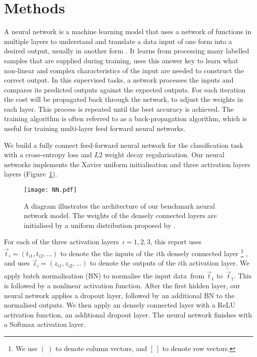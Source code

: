 \section{Methods \label{chapter2}}
A neural network is a machine learning model that uses a network of functions in multiple layers to understand and translate a data input of one form into a desired output,
usually in another form \citep{Bishop:2006:PRM:1162264}.
It learns from processing many labelled samples that are supplied during training, uses this answer key to learn what non-linear and complex characteristics of the input are needed to construct the correct output.
In this supervised tasks,
a network processes the inputs and compares its predicted outputs against the expected outputs.
For each iteration the cost will be propagated back through the network,
to adjust the weights in each layer.
This process is repeated until the best accuracy is achieved.
The training algorithm is often referred to as a back-propagation algorithm,
which is useful for training multi-layer feed forward neural networks.

We build a fully connect feed-forward neural network for the classification task with a cross-entropy loss and $L2$ weight decay regularisation. Our neural networks implements the Xavier uniform initialisation and three activation layers layers (Figure~\ref{fig:nn}). 
\begin{figure}
    \centering
    \texttt{[image: NN.pdf]}
    \caption{A diagram illustrates the architecture of our benchmark neural network model. The weights of the densely connected layers are initialised by a uniform distribution proposed by \citet{pmlr-v9-glorot10a}.}
    \label{fig:nn}
\end{figure}
For each of the three activation layers~$i=1,2,3$, this report uses $\vec t_i=(t_{i1},t_{i2},\ldots)$ to denote the the inputs of the $i$th densely connected layer
\footnote{We use $(\ )$ to denote column vectors, and $[\ ]$ to denote row vectors.}
, and uses $\vec z_i=(z_{i1},z_{i2},\ldots)$ to denote the outputs of the $i$th activation layer. 
We apply batch normalisation (BN) to normalise the input data~from $\vec t_1$ to~$\tilde{\vec t}_1$. This is followed by a nonlinear activation function. After the first hidden layer, our neural network applies a dropout layer, followed by an additional BN to the normalised outputs. 
We then apply an densely connected layer with a ReLU activation function, an additional dropout layer. The neural network finishes with a Softmax activation layer. 

